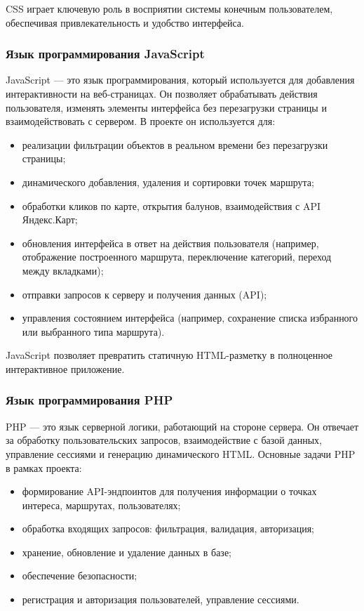 CSS играет ключевую роль в восприятии системы конечным пользователем, обеспечивая привлекательность и удобство интерфейса.

\subsubsection{Язык программирования JavaScript}

JavaScript\cite{b18} — это язык программирования, который используется для добавления интерактивности на веб-страницах. Он позволяет обрабатывать действия пользователя, изменять элементы интерфейса без перезагрузки страницы и взаимодействовать с сервером. В проекте он используется для:
\begin{itemize}
	\item реализации фильтрации объектов в реальном времени без перезагрузки страницы;
	\item динамического добавления, удаления и сортировки точек маршрута;
	\item обработки кликов по карте, открытия балунов, взаимодействия с API Яндекс.Карт;
	\item обновления интерфейса в ответ на действия пользователя (например, отображение построенного маршрута, переключение категорий, переход между вкладками);
	\item отправки запросов к серверу и получения данных (API);
	\item управления состоянием интерфейса (например, сохранение списка избранного или выбранного типа маршрута).
\end{itemize}

JavaScript позволяет превратить статичную HTML-разметку в полноценное интерактивное приложение.

\subsubsection{Язык программирования PHP}

PHP — это язык серверной логики, работающий на стороне сервера. Он отвечает за обработку пользовательских запросов, взаимодействие с базой данных, управление сессиями и генерацию динамического HTML. Основные задачи PHP в рамках проекта:
\begin{itemize}
	\item формирование API-эндпоинтов для получения информации о точках интереса, маршрутах, пользователях;
	\item обработка входящих запросов: фильтрация, валидация, авторизация;
	\item хранение, обновление и удаление данных в базе;
	\item обеспечение безопасности;
	\item регистрация и авторизация пользователей, управление сессиями.
\end{itemize}

